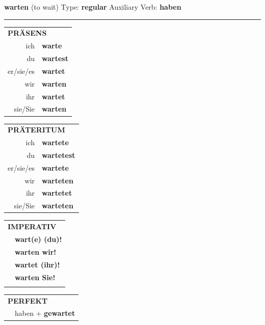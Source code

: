 \documentclass[10pt,a4paper]{revtex4-2}
\begin{document}
\begin{verbbox}
    {\Large \bf warten} (to wait) \hfill Type: \textbf{regular} \hfill Auxiliary Verb: \textbf{haben} 
    
     \vspace{5pt}

    \hrule
    
    \vspace{5pt}

  \begin{tabular}{rl}
     \multicolumn{2}{l}{\textbf{PRÄSENS} }\\
    ich & \textbf{warte}\\
    du & \textbf{wartest}\\
    er/sie/es & \textbf{wartet}\\
    wir & \textbf{warten}\\
    ihr & \textbf{wartet}\\
    sie/Sie & \textbf{warten}\\
  \end{tabular}
  \hfill
     \begin{tabular}{rl}
    \multicolumn{2}{l}{\textbf{PRÄTERITUM} }\\
    ich & \textbf{wartete}\\
    du & \textbf{wartetest}\\
    er/sie/es & \textbf{wartete}\\
    wir & \textbf{warteten}\\
    ihr & \textbf{wartetet}\\
    sie/Sie & \textbf{warteten}\\
  \end{tabular}
  \hfill
  \begin{tabular}{rl}
     \multicolumn{2}{l}{\textbf{IMPERATIV} }\\
   & \textbf{wart(e) (du)!}\\
   & \textbf{warten wir!}\\
   & \textbf{wartet (ihr)!}\\
   & \textbf{warten Sie!}\\
   & \vspace{10pt}
  \end{tabular}

    \vspace{10pt}

 \begin{tabular}{rl}
     \multicolumn{2}{l}{\textbf{PERFEKT}}\\
  &  haben + \textbf{gewartet}\\
  \end{tabular}
\hfill
   \begin{tabular}{rl}
   

\end{tabular}
\end{verbbox}
\end{document}
